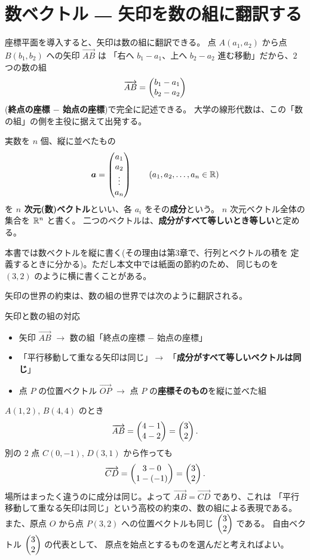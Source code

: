 \section{数ベクトル ― 矢印を数の組に翻訳する}

座標平面を導入すると、矢印は数の組に翻訳できる。
点 $A(a_1, a_2)$ から点 $B(b_1, b_2)$ への矢印 $\overrightarrow{AB}$ は
「右へ $b_1 - a_1$、上へ $b_2 - a_2$ 進む移動」だから、$2$ つの数の組
\[
\overrightarrow{AB} = \begin{pmatrix}b_1 - a_1 \\ b_2 - a_2\end{pmatrix}
\]
(\textbf{終点の座標 $-$ 始点の座標})で完全に記述できる。
大学の線形代数は、この「数の組」の側を主役に据えて出発する。

\begin{teigi}[数ベクトル]
実数を $n$ 個、縦に並べたもの
\[
\bm{a} = \begin{pmatrix}a_1 \\ a_2 \\ \vdots \\ a_n\end{pmatrix}
\qquad (a_1, a_2, \dots, a_n \in \mathbb{R})
\]
を \textbf{$n$ 次元(数)ベクトル}といい、各 $a_i$ をその\textbf{成分}という。
$n$ 次元ベクトル全体の集合を $\mathbb{R}^n$ と書く。
二つのベクトルは、\textbf{成分がすべて等しいとき等しい}と定める。
\end{teigi}

\begin{chui}
本書では数ベクトルを縦に書く(その理由は第3章で、行列とベクトルの積を
定義するときに分かる)。ただし本文中では紙面の節約のため、
同じものを $(3, 2)$ のように横に書くことがある。
\end{chui}

矢印の世界の約束は、数の組の世界では次のように翻訳される。

\begin{itembox}[l]{矢印と数の組の対応}
\begin{itemize}
\item 矢印 $\overrightarrow{AB}$ $\longrightarrow$
数の組「終点の座標 $-$ 始点の座標」
\item 「平行移動して重なる矢印は同じ」$\longrightarrow$
「\textbf{成分がすべて等しいベクトルは同じ}」
\item 点 $P$ の位置ベクトル $\overrightarrow{OP}$ $\longrightarrow$
点 $P$ の\textbf{座標そのもの}を縦に並べた組
\end{itemize}
\end{itembox}

\begin{rei}[自由ベクトルの同一視]
$A(1, 2)$, $B(4, 4)$ のとき
\[
\overrightarrow{AB} = \begin{pmatrix}4 - 1 \\ 4 - 2\end{pmatrix} = \begin{pmatrix}3 \\ 2\end{pmatrix}.
\]
別の $2$ 点 $C(0, -1)$, $D(3, 1)$ から作っても
\[
\overrightarrow{CD} = \begin{pmatrix}3 - 0 \\ 1 - (-1)\end{pmatrix} = \begin{pmatrix}3 \\ 2\end{pmatrix}.
\]
場所はまったく違うのに成分は同じ。よって
$\overrightarrow{AB} = \overrightarrow{CD}$ であり、これは
「平行移動して重なる矢印は同じ」という高校の約束の、数の組による表現である。
また、原点 $O$ から点 $P(3, 2)$ への位置ベクトルも同じ $\begin{pmatrix}3 \\ 2\end{pmatrix}$ である。
自由ベクトル $\begin{pmatrix}3 \\ 2\end{pmatrix}$ の代表として、
原点を始点とするものを選んだと考えればよい。
\end{rei}

